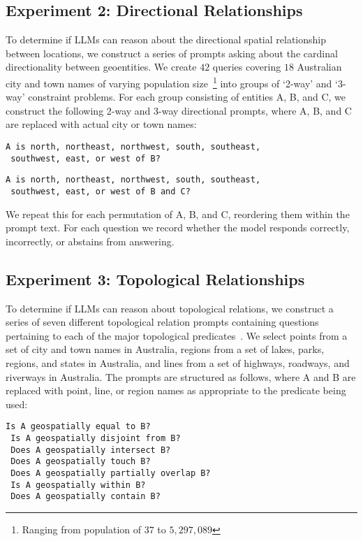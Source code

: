 \subsection{Experiment 2: Directional Relationships}

To determine if LLMs can reason about the directional spatial relationship between locations, we construct a series of prompts asking about the cardinal directionality between geoentities.
We create $42$ queries covering $18$ Australian city and town names of varying population size~\footnote{Ranging from population of $37$ to $5,297,089$ } into groups of `2-way' and `3-way' constraint problems.
For each group consisting of entities A, B, and C, we construct the following 2-way and 3-way directional prompts, where A, B, and C are replaced with actual city or town names: 

\begin{lstlisting}[title=Prompt 3: 2-way Directional Prompt]
 A is north, northeast, northwest, south, southeast, 
 southwest, east, or west of B?
\end{lstlisting}

\begin{lstlisting}[title=Prompt 4: 3-way Directional Prompt]
 A is north, northeast, northwest, south, southeast, 
 southwest, east, or west of B and C?
\end{lstlisting}

\noindent We repeat this for each permutation of A, B, and C, reordering them within the prompt text.
For each question we record whether the model responds correctly, incorrectly, or abstains from answering.



\subsection{Experiment 3: Topological Relationships}
To determine if LLMs can reason about topological relations, we construct a series of seven different topological relation prompts containing questions pertaining to each of the major topological predicates~\cite{Carniel2023}.
We select points from a set of city and town names in Australia, regions from a set of lakes, parks, regions, and states in Australia, and lines from a set of highways, roadways, and riverways in Australia.
The prompts are structured as follows, where A and B are replaced with point, line, or region names as appropriate to the predicate being used:

\begin{lstlisting}[title=Prompts 5-11: Topological Relation Prompts]
 Is A geospatially equal to B?
 Is A geospatially disjoint from B?
 Does A geospatially intersect B?
 Does A geospatially touch B?
 Does A geospatially partially overlap B?
 Is A geospatially within B?
 Does A geospatially contain B?
\end{lstlisting}

